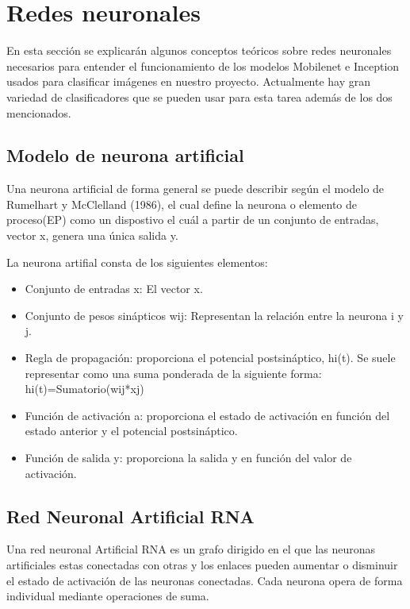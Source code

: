 \section{Redes neuronales}

En esta sección se explicarán algunos conceptos teóricos sobre redes neuronales necesarios para entender el funcionamiento de los modelos Mobilenet e Inception usados para clasificar imágenes en nuestro proyecto. Actualmente hay gran variedad de clasificadores que se pueden usar para esta tarea además de los dos mencionados.

\subsection{Modelo de neurona artificial}

Una neurona artificial de forma general se puede describir según el modelo de Rumelhart y McClelland (1986), el cual define la neurona o elemento de proceso(EP) como un dispostivo el cuál a partir de un conjunto de entradas, vector x, genera una única salida y.


La neurona artifial consta de los siguientes elementos:

\begin{itemize}
	\item{Conjunto de entradas x}: El vector x.
	\item{Conjunto de pesos sinápticos wij}: Representan la relación entre la neurona i y j.
	\item{Regla de propagación}: proporciona el potencial postsináptico, hi(t). Se suele representar como una suma ponderada de la siguiente forma:
	hi(t)=Sumatorio(wij*xj)
	\item{Función de activación a}: proporciona el estado de activación en función del estado anterior y el potencial postsináptico.
	\item{Función de salida y}: proporciona la salida y en función del valor de activación.
\end{itemize}

\subsection{Red Neuronal Artificial RNA}

Una red neuronal Artificial RNA es un grafo dirigido en el que las neuronas artificiales estas conectadas con otras y los enlaces pueden aumentar o disminuir el estado de activación de las neuronas conectadas. Cada neurona opera de forma individual mediante operaciones de suma.


